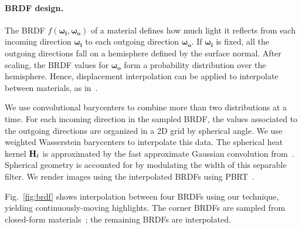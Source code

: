 
\paragraph*{BRDF design.}

The BRDF $f(\mathbf{\omega_i}, \mathbf{\omega_o})$ of a material defines how much light it reflects from each incoming direction $\mathbf{\omega_i}$ to each outgoing direction $\mathbf{\omega_o}$. If $\mathbf{\omega_i}$ is fixed, all the outgoing directions fall on a hemisphere defined by the surface normal. After scaling, the BRDF values for $\mathbf{\omega_o}$ form a probability distribution over the hemisphere.  Hence, displacement interpolation can be applied to interpolate between materials, as in~\cite{bonneel-2011}.%


We use convolutional barycenters to combine more than two distributions at a time. For each incoming direction in the sampled BRDF, the values associated to the outgoing directions are organized in a 2D grid by spherical angle.  We use weighted Wasserstein barycenters to interpolate this data. The spherical heat kernel $\mathbf{H}_t$ is approximated by the fast approximate Gaussian convolution from~\cite{deriche-1993}.  Spherical geometry is accounted for by modulating the width of this separable filter.  We render images using the interpolated BRDFs using PBRT~\cite{pharr-2010}.

Fig.~\ref{fig:brdf} shows interpolation between four BRDFs using our technique, yielding continuously-moving highlights. The corner BRDFs are sampled from closed-form materials~\cite{blinn-1977,ashikhmin-2000}; the remaining BRDFs are interpolated.  


